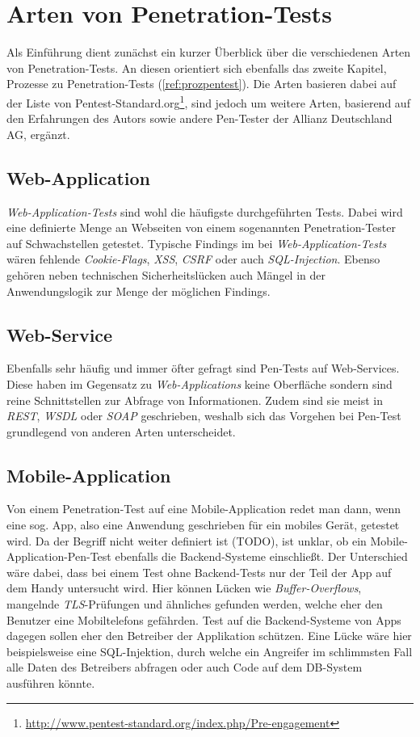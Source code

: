 \chapter{Arten von Penetration-Tests}
Als Einführung dient zunächst ein kurzer Überblick über die verschiedenen Arten von Penetration-Tests. An diesen orientiert sich ebenfalls das zweite Kapitel, Prozesse zu Penetration-Tests (\ref{ref:prozpentest}). Die Arten basieren dabei auf der Liste von Pentest-Standard.org\footnote{\url{http://www.pentest-standard.org/index.php/Pre-engagement}}, sind jedoch um weitere Arten, basierend auf den Erfahrungen des Autors sowie andere Pen-Tester der Allianz Deutschland AG, ergänzt.

	\section{Web-Application}
	\textit{Web-Application-Tests} sind wohl die häufigste durchgeführten Tests. Dabei wird eine definierte Menge an Webseiten von einem sogenannten Penetration-Tester auf Schwachstellen getestet. Typische Findings im bei \textit{Web-Application-Tests} wären fehlende \textit{Cookie-Flags}, \textit{XSS}, \textit{CSRF} oder auch \textit{SQL-Injection}. Ebenso gehören neben technischen Sicherheitslücken auch Mängel in der Anwendungslogik zur Menge der möglichen Findings.
	
	\section{Web-Service}
	Ebenfalls sehr häufig und immer öfter gefragt sind Pen-Tests auf Web-Services. Diese haben im Gegensatz zu \textit{Web-Applications} keine Oberfläche sondern sind reine Schnittstellen zur Abfrage von Informationen. Zudem sind sie meist in \textit{REST}, \textit{WSDL} oder \textit{SOAP} geschrieben, weshalb sich das Vorgehen bei Pen-Test grundlegend von anderen Arten unterscheidet.
	
	\section{Mobile-Application}
	Von einem Penetration-Test auf eine Mobile-Application redet man dann, wenn eine sog. App, also eine Anwendung geschrieben für ein mobiles Gerät, getestet wird. Da der Begriff nicht weiter definiert ist (TODO), ist unklar, ob ein Mobile-Application-Pen-Test ebenfalls die Backend-Systeme einschließt. Der Unterschied wäre dabei, dass bei einem Test ohne Backend-Tests nur der Teil der App auf dem Handy untersucht wird. Hier können Lücken wie \textit{Buffer-Overflows}, mangelnde \textit{TLS}-Prüfungen und ähnliches gefunden werden, welche eher den Benutzer eine Mobiltelefons gefährden. Test auf die Backend-Systeme von Apps dagegen sollen eher den Betreiber der Applikation schützen. Eine Lücke wäre hier beispielsweise eine SQL-Injektion, durch welche ein Angreifer im schlimmsten Fall alle Daten des Betreibers abfragen oder auch Code auf dem DB-System ausführen könnte.
	
